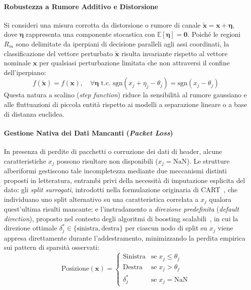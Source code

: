 \paragraph{Robustezza a Rumore Additivo e Distorsione}
Si consideri una misura corrotta da distorsione o rumore di canale $\tilde{\mathbf{x}} = \mathbf{x} + \boldsymbol{\eta}$, dove $\boldsymbol{\eta}$ rappresenta una componente stocastica con $\mathbb{E}[\boldsymbol{\eta}] = \mathbf{0}$. Poiché le regioni $R_m$ sono delimitate da iperpiani di decisione paralleli agli assi coordinati, la classificazione del vettore perturbato $\tilde{\mathbf{x}}$ risulta invariante rispetto al vettore nominale $\mathbf{x}$ per qualsiasi perturbazione limitata che non attraversi il confine dell'iperpiano:
\begin{equation}
    f(\tilde{\mathbf{x}}) = f(\mathbf{x}), \quad \forall \boldsymbol{\eta} \text{ t.c. } \text{sgn}(x_j + \eta_j - \theta_j) = \text{sgn}(x_j - \theta_j)
\end{equation}
Questa natura a scalino (\textit{step function}) riduce la sensibilità al rumore gaussiano e alle fluttuazioni di piccola entità rispetto ai modelli a separazione lineare o a base di distanza euclidea.

\paragraph{Gestione Nativa dei Dati Mancanti (\textit{Packet Loss})}
In presenza di perdite di pacchetti o corruzione dei dati di header, alcune caratteristiche $x_j$ possono risultare non disponibili ($x_j = \text{NaN}$). Le strutture alberiformi gestiscono tale incompletezza mediante due meccanismi distinti proposti in letteratura, entrambi privi della necessità di imputazione esplicita del dato: gli \textit{split surrogati}, introdotti nella formulazione originaria di CART~\cite{breiman1984}, che individuano uno split alternativo su una caratteristica correlata a $x_j$ qualora quest'ultima risulti mancante; e l'instradamento a \textit{direzione predefinita} (\textit{default direction}), proposto nel contesto degli algoritmi di boosting scalabili~\cite{chen2016}, in cui la direzione ottimale $\delta^*_j \in \{\text{sinistra}, \text{destra}\}$ per ciascun nodo di split su $x_j$ viene appresa direttamente durante l'addestramento, minimizzando la perdita empirica sui pattern di sparsità osservati:
\begin{equation}
    \text{Posizione}(\mathbf{x}) =
    \begin{cases}
        \text{Sinistra} & \text{se } x_j \le \theta_j \\
        \text{Destra} & \text{se } x_j > \theta_j \\
        \delta^*_j & \text{se } x_j = \text{NaN}
    \end{cases}
\end{equation}

